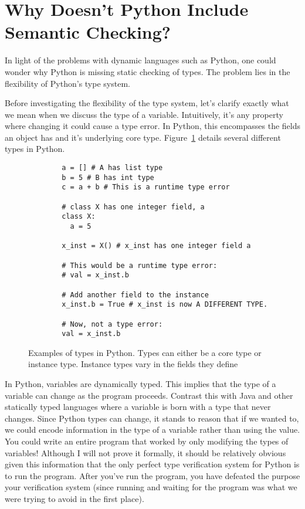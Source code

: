\documentclass{article}[12pt]
\begin{document}
\section{Why Doesn't Python Include Semantic Checking?}
In light of the problems with dynamic languages such as Python, one could wonder why Python is missing
static checking of types. The problem lies in the flexibility of Python's type system. 

Before investigating the flexibility of the type system, let's clarify exactly what we mean when we
discuss the type of a variable. Intuitively, it's any property where changing it could cause a type
error. In Python, this encompasses the fields an object has and it's underlying core type.
Figure~\ref{fig:pythontypes} details several different types in Python.

\begin{figure}
    \begin{verbatim}
        a = [] # A has list type
        b = 5 # B has int type
        c = a + b # This is a runtime type error

        # class X has one integer field, a
        class X:
          a = 5

        x_inst = X() # x_inst has one integer field a

        # This would be a runtime type error:
        # val = x_inst.b
        
        # Add another field to the instance
        x_inst.b = True # x_inst is now A DIFFERENT TYPE. 
        
        # Now, not a type error:
        val = x_inst.b
    \end{verbatim}
    \caption{Examples of types in Python. Types can either be a core type or instance type. Instance
    types vary in the fields they define}
    \label{fig:pythontypes}
\end{figure}

In Python, variables are dynamically typed. This implies that the type of a variable can change as
the program proceeds. Contrast this with Java and other statically typed languages where a variable
is born with a type that never changes. Since Python types can change, it stands to reason that if
we wanted to, we could encode information in the type of a variable rather than using the value. You
could write an entire program that worked by only modifying the types of variables!  Although I will
not prove it formally, it should be relatively obvious given this information that the only perfect
type verification system for Python is to run the program.  After you've run the program, you have
defeated the purpose your verification system (since running and waiting for the program was what we
were trying to avoid in the first place).
\end{document}
